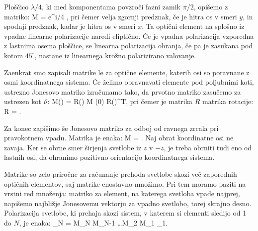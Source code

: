 Ploščico $\lambda/4$, ki med komponentama povzroči fazni zamik $\pi/2$, opišemo z matriko:
\beq
M = e^{\pm i\pi/4}
\left[\begin{array}{cc}
1 & 0 \\
0 & \mp i\\
\end{array}\right]\!\!,
\label{eq:03_56}
\eeq
pri čemer velja zgornji predznak, če je hitra os v smeri $y$, in spodnji predznak, kadar
je hitra os v smeri $x$. Ta optični element na splošno iz vpadne linearne
polarizacije naredi eliptično. Če je vpadna polarizacija vzporedna z
lastnima osema ploščice, se linearna polarizacija ohranja, če pa je
zasukana pod kotom $45^\circ$, nastane iz linearnega krožno polarizirano valovanje. 

Zaenkrat smo zapisali matrike le za optične elemente, katerih osi so poravnane z osmi
koordinatnega sistema. Če želimo obravnavati elemente pod poljubnimi koti, 
ustrezno Jonesovo matriko izračunamo tako, da prvotno matriko zasučemo za ustrezen kot $\vartheta$:
\beq
M(\vartheta) = R(\vartheta) \cdot M (0) \cdot R(\vartheta)^{T},
\label{eq:03_57}
\eeq
pri čemer je matrika $R$ matrika rotacije:
\beq
R = \!\!.
\label{eq:03_58}
\eeq

Za konec zapišimo še Jonesovo matriko za odboj od ravnega zrcala pri
pravokotnem vpadu. Matrika je enaka:
\beq
M = \left[\begin{array}{cc}
1 & 0 \\
0 & -1\\
\end{array}\right]\!\!.
\label{eq:03_59}
\eeq
Naj obrat koordinatne osi ne zavaja. Ker se obrne smer 
širjenja svetlobe iz $z$ v $-z$, je treba obrniti tudi eno od lastnih osi, 
da ohranimo pozitivno orientacijo koordinatnega sistema. 

Matrike so zelo priročne za računanje prehoda svetlobe skozi več
zaporednih optičnih elementov, saj matrike enostavno množimo. Pri tem 
moramo paziti na vrstni red množenja: matriko za element, na katerega
svetloba vpade najprej, napišemo najbližje Jonesovemu vektorju za vpadno svetlobo, 
torej skrajno desno. Polarizacija svetlobe, ki prehaja skozi sistem, 
v katerem si elementi sledijo od 1 do $N$, je enaka:
\beq
{}_N = M_N \cdot M_{N-1} \dots M_2 \cdot M_1 \cdot {}_1.
\label{eq:03_60}
\eeq

